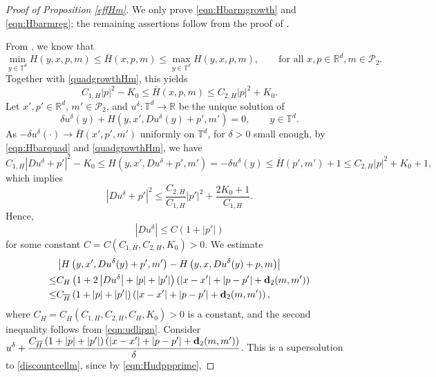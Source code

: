 \documentclass[reqno,11pt]{amsart}
\numberwithin{equation}{section}
\newcommand{\R}{\mathbb{R}} %
\newcommand{\T}{\mathbb{T}}
\renewcommand{\bar}{\overline}
\begin{document}
\begin{proof}[Proof of Proposition \ref{effHm}]
    We only prove \eqref{eqn:Hbarmgrowth} and \eqref{eqn:Hbarmreg}; the remaining assertions follow from the proof of \cite[Theorems 4.3, 4.14]{tran_hamilton-jacobi_2021}.

    From \cite[(4.17)]{tran_hamilton-jacobi_2021}, we know that
    \[
    \min_{y \in \T^d} H(y,x, p,m) \leq \bar{H}(x,p,m) \leq \max_{y\in \T^d} H(y,x, p, m), \qquad \text{for all }x, p \in \R^d, m \in \mathcal{P}_2.
    \]
Together with \eqref{quadgrowthHm}, this yields
\begin{equation}\label{eqn:Hbarquad}
    C_{1,H}|p|^2-K_0 \leq \bar{H}(x,p,m) \leq C_{2,H}|p|^2+K_0.
\end{equation}
    Let $x', p'\in \R^d$, $m' \in \mathcal{P}_2$, and $u^\delta: \T^d \to \R$ be the unique solution of
    \[
    \delta u^\delta(y) + H \left(y, x',Du^\delta(y)+p', m'\right)=0, \qquad y \in \T^d.
    \]
    As $-\delta u^\delta(\cdot) \to \bar{H}(x', p', m')$ uniformly on $\T^d$, for $\delta>0$ small enough, by \eqref{eqn:Hbarquad} and \eqref{quadgrowthHm}, we have
    \[
    C_{1, H}\left|Du^\delta+p'\right|^2-K_0\leq H(y,x', Du^\delta+p',m')=-\delta u^\delta (y) \leq \bar{H}(p',m')+1 \leq C_{2,H}|p|^2+K_0+1,
    \]
    which implies
    \[
    \left|Du^\delta+p'\right|^2\leq \frac{C_{2,H}}{C_{1,H}} |p'|^2+\frac{2K_0+1}{C_{1,H}}.
    \]
    Hence,
    \begin{equation}\label{eqn:udlipm}
        \left|Du^\delta\right| \leq C\left(1+\left|p'\right|\right)
    \end{equation}
    for some constant $C=C\left(C_{1,H}, C_{2,H}, K_0\right)>0$.
    We estimate
    \begin{equation}\label{eqn:Hudppprime}
    \begin{aligned}
    &\left|H\left(y,x', Du^\delta(y) +p',m'\right)-H\left(y,x,Du^\delta(y) +p,m\right)\right| \\\leq & C_H\left(1+2\left|Du^\delta\right|+|p|+|p'|\right)\left(\left|x-x'\right|+\left|p-p'\right|+{\bf d}_2(m,m')\right)\\
    \leq & C_{\bar{H}} \left(1+|p|+|p'|\right)\left(\left|x-x'\right|+\left|p-p'\right|+{\bf d}_2(m,m')\right),
    \end{aligned}
    \end{equation}
where $C_{\bar{H}}=C_{\bar{H}}\left(C_{1,H}, C_{2,H}, C_H, K_0\right)>0$ is a constant, and the second inequality follows from \eqref{eqn:udlipm}. Consider $\displaystyle u^\delta + \frac{C_{\bar{H}}\left(1+|p|+|p'|\right)\left(\left|x-x'\right|+\left|p-p'\right|+{\bf d}_2(m,m')\right)}{\delta}$. This is a supersolution to \eqref{discountcellm}, since by \eqref{eqn:Hudppprime},

\end{proof}
\end{document}

